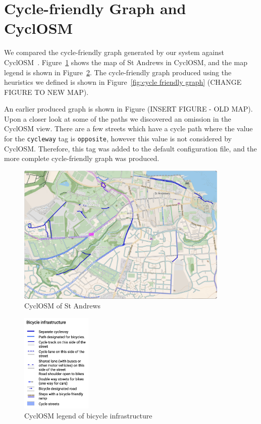 \documentclass[12pt,a4paper]{report}
\begin{document}
\section{Cycle-friendly Graph and CyclOSM} \label{sec:eval_osm}
We compared the cycle-friendly graph generated by our system against CyclOSM~\cite{cycleOSM}. Figure~\ref{fig:cyclosm st andrews} shows the map of St Andrews in CyclOSM, and the map legend is shown in Figure~\ref{fig:cyclosm legend}. The cycle-friendly graph produced using the heuristics we defined is shown in Figure~\ref{fig:cycle friendly graph} (CHANGE FIGURE TO NEW MAP).

An earlier produced graph is shown in Figure (INSERT FIGURE - OLD MAP). Upon a closer look at some of the paths we discovered an omission in the CyclOSM view. There are a few streets which have a cycle path where the value for the \texttt{cycleway} tag is \texttt{opposite}, however this value is not considered by CyclOSM. Therefore, this tag was added to the default configuration file, and the more complete cycle-friendly graph was produced.

\begin{figure}[ht]
    \centering
    \includegraphics[width=0.9\textwidth]{plan_images/cyclosm_st_andrews.png}
    \caption{CyclOSM of St Andrews}
    \label{fig:cyclosm st andrews}
\end{figure}

\begin{figure}[ht]
    \centering
    \includegraphics[width=0.3\textwidth]{plan_images/cyclosm_legend.png}
    \caption{CyclOSM legend of bicycle infrastructure}
    \label{fig:cyclosm legend}
\end{figure}
\end{document}
